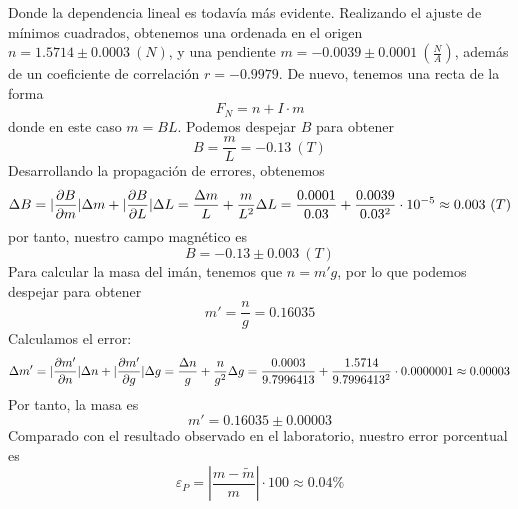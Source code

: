 \documentclass{article}
\begin{document}
Donde la dependencia lineal es todavía más evidente. Realizando el ajuste de mínimos cuadrados, obtenemos una ordenada en el origen
$n =1.5714\pm 0.0003~(N)$, y una pendiente $m=-0.0039\pm0.0001~(\frac{N}{A})$, además de un coeficiente de correlación $r =-0.9979$. De nuevo,
tenemos una recta de la forma
\[
    F_N = n + I\cdot m
\]
donde en este caso $m = BL$. Podemos despejar $B$ para obtener
\[
    B = \frac{m}{L} = -0.13~(T)
\]
Desarrollando la propagación de errores, obtenemos
\[
    \Delta B = |\pdv{B}{m}|\Delta m + |\pdv{B}{L}|\Delta L = \frac{\Delta m }{L} + \frac{m}{L^2}\Delta L = 
    \frac{0.0001}{0.03}+\frac{0.0039}{0.03^2}\cdot 10^{-5}\approx 0.003~(T)
\]
por tanto, nuestro campo magnético es
\[
    B = -0.13\pm 0.003~(T)
\]
Para calcular la masa del imán, tenemos que $n = m'g$, por lo que podemos despejar para obtener
\[
    m' = \frac{n}{g}=0.16035
\]
Calculamos el error:
\[
    \Delta m' = |\pdv{m'}{n}|\Delta n +|\pdv{m'}{g}|\Delta g = \frac{\Delta n}{g} + \frac{n}{g^2}\Delta g = \frac{0.0003}{9.7996413} + 
    \frac{1.5714}{9.7996413^2}\cdot 0.0000001 \approx 0.00003
\]
Por tanto, la masa es
\[
    m' = 0.16035\pm0.00003
\]
Comparado con el resultado observado en el laboratorio, nuestro error porcentual es
\[
    \varepsilon_P = |\frac{m-\tilde{m}}{m}|\cdot 100 \approx 0.04\%
\]
\end{document}

